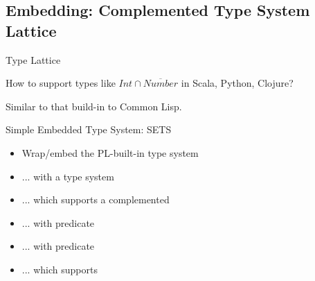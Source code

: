 \subsection{Embedding: Complemented Type System Lattice}

{  
\begin{frame}{ Type Lattice}

  How to support types like \textcolor{greeny}{$Int\cap\overline{Number}$} in Scala, Python, Clojure?

  Similar to that build-in to  Common Lisp.


\end{frame}
}

\begin{frame}{Simple Embedded Type System: SETS}

  \begin{itemize}
  \item Wrap/embed the PL-built-in type system
  \item ... with a  type system
  \item ... which supports a complemented 
  \item ... with  predicate
  \item ... with  predicate
  \item ... which supports 
  \end{itemize}

\end{frame}


\newsavebox\tdast
\begin{lrbox}{\tdast}
  \begin{minipage}{11cm}
    
  \end{minipage}
\end{lrbox}


